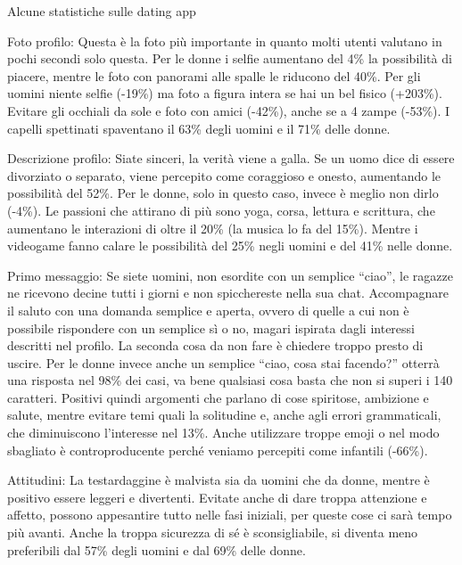 \documentclass[12pt]{book} %
\begin{document}
\begin{mdframed}[linewidth=1pt]
Alcune statistiche sulle dating app

Foto profilo: Questa è la foto più importante in quanto molti utenti valutano in pochi secondi solo questa. Per le donne
i selfie aumentano del 4\% la possibilità di piacere, mentre le foto con panorami alle spalle le riducono del 40\%. Per
gli uomini niente selfie (-19\%) ma foto a figura intera se hai un bel fisico (+203\%). Evitare gli occhiali da sole e
foto con amici (-42\%), anche se a 4 zampe (-53\%). I capelli spettinati spaventano il 63\% degli uomini e il 71\%
delle donne. 

Descrizione profilo: Siate sinceri, la verità viene a galla. Se un uomo dice di essere divorziato o separato, viene
percepito come coraggioso e onesto, aumentando le possibilità del 52\%. Per le donne, solo in questo caso, invece è
meglio non dirlo (-4\%). Le passioni che attirano di più sono yoga, corsa, lettura e scrittura, che aumentano le
interazioni di oltre il 20\% (la musica lo fa del 15\%). Mentre i videogame fanno calare le possibilità del 25\% negli
uomini e del 41\% nelle donne.

Primo messaggio: Se siete uomini, non esordite con un semplice “ciao”, le ragazze ne ricevono decine tutti i giorni e
non spicchereste nella sua chat. Accompagnare il saluto con una domanda semplice e aperta, ovvero di quelle a cui non è
possibile rispondere con un semplice sì o no, magari ispirata dagli interessi descritti nel profilo. La seconda cosa da
non fare è chiedere troppo presto di uscire. Per le donne invece anche un semplice “ciao, cosa stai facendo?” otterrà
una risposta nel 98\% dei casi, va bene qualsiasi cosa basta che non si superi i 140 caratteri. Positivi quindi
argomenti che parlano di cose spiritose, ambizione e salute, mentre evitare temi quali la solitudine e, anche agli
errori grammaticali, che diminuiscono l'interesse nel 13\%. Anche utilizzare troppe emoji o nel modo sbagliato è
controproducente perché veniamo percepiti come infantili (-66\%).

Attitudini: La testardaggine è malvista sia da uomini che da donne, mentre è positivo essere leggeri e divertenti.
Evitate anche di dare troppa attenzione e affetto, possono appesantire tutto nelle fasi iniziali, per queste cose ci
sarà tempo più avanti. Anche la troppa sicurezza di sé è sconsigliabile, si diventa meno preferibili dal 57\% degli
uomini e dal 69\% delle donne.


\end{mdframed}
\end{document}
